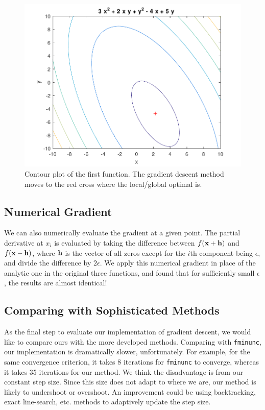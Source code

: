 \begin{figure}[h!]
\centering
\includegraphics[scale=0.4]{hw1_1.pdf}
\caption{Contour plot of the first function. The gradient descent method moves to the red cross where the local/global optimal is.}
\end{figure}


\subsection{Numerical Gradient}
We can also numerically evaluate the gradient at a given point. The partial derivative at $x_i$ is evaluated by taking the difference between $f(\boldsymbol{\mathbf{x}}+\boldsymbol{\mathbf{h}})$ and $f(\boldsymbol{\mathbf{x}}-\boldsymbol{\mathbf{h}})$, where $\boldsymbol{\mathbf{h}}$ is the vector of all zeros except for the $i$th component being $\epsilon$, and divide the difference by $2\epsilon$. We apply this numerical gradient in place of the analytic one in the original three functions, and found that for sufficiently small $\epsilon$, the results are almost identical!

\subsection{Comparing with Sophisticated Methods}
As the final step to evaluate our implementation of gradient descent, we would like to compare ours with the more developed methods. Comparing with \texttt{fminunc}, our implementation is dramatically slower, unfortunately. For example, for the same convergence criterion, it takes 8 iterations for \texttt{fminunc} to converge, whereas it takes 35 iterations for our method. We think the disadvantage is from our constant step size. Since this size does not adapt to where we are, our method is likely to undershoot or overshoot. An improvement could be using backtracking, exact line-search, etc. methods to adaptively update the step size.  